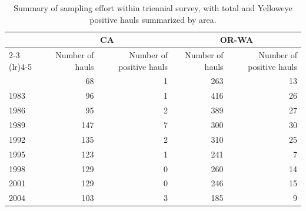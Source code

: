 \documentclass[
  english,
]{article}
\begin{document}
\begin{longtable}{l|rrrr}

\caption{\label{tbl-sampling-effort-triennial}Summary of sampling effort
within triennial survey, with total and Yelloweye positive hauls
summarized by area.}

\tabularnewline

\toprule
 & \multicolumn{2}{c}{CA} & \multicolumn{2}{c}{OR-WA} \\ 
\cmidrule(lr){2-3} \cmidrule(lr){4-5}
 & Number of hauls & Number of positive hauls & Number of hauls & Number of positive hauls \\ 
\midrule\addlinespace[2.5pt]
1980 & 68 & 1 & 263 & 13 \\ 
1983 & 96 & 1 & 416 & 26 \\ 
1986 & 95 & 2 & 389 & 27 \\ 
1989 & 147 & 7 & 300 & 30 \\ 
1992 & 135 & 2 & 310 & 25 \\ 
1995 & 123 & 1 & 241 & 7 \\ 
1998 & 129 & 0 & 260 & 14 \\ 
2001 & 129 & 0 & 246 & 15 \\ 
2004 & 103 & 3 & 185 & 9 \\ 
\bottomrule

\end{longtable}

\endgroup

\newpage{}

\begingroup
\fontsize{9.0pt}{11.0pt}\selectfont
\end{document}

